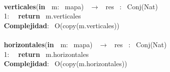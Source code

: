 \begin{Algoritmos}
\makebox[\linewidth]{\rule{\textwidth}{0.4pt}}
\\
\makebox[\linewidth]{\rule{\textwidth}{0.4pt}}
\textbf{verticales}(\textbf{in \ }m: \ mapa) \ $\longrightarrow$ \ res \ : \ Conj(Nat)\\
1: \  \ \textbf{return} \ m.verticales\\
\textbf{Complejidad}: \ O(copy(m.verticales))\\
\makebox[\linewidth]{\rule{\textwidth}{0.4pt}}
\\
\makebox[\linewidth]{\rule{\textwidth}{0.4pt}}
\textbf{horizontales}(\textbf{in \ }m: \ mapa) \ $\longrightarrow$ \ res \ : \ Conj(Nat)\\
1: \  \ \textbf{return} \ m.horizontales\\
\textbf{Complejidad}: \ O(copy(m.horizontales))\\
\makebox[\linewidth]{\rule{\textwidth}{0.4pt}}

\end{Algoritmos}
